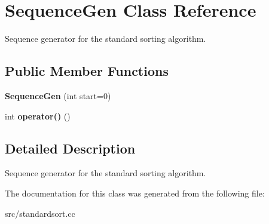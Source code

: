 \hypertarget{classSequenceGen}{
\section{SequenceGen Class Reference}
\label{d4/d99/classSequenceGen}
}


Sequence generator for the standard sorting algorithm.  


\subsection*{Public Member Functions}
\begin{DoxyCompactItemize}
\item 
\hypertarget{classSequenceGen_a4d1ef90f7ec766284371caf9e6c4f791}{
{\bfseries SequenceGen} (int start=0)}
\label{d4/d99/classSequenceGen_a4d1ef90f7ec766284371caf9e6c4f791}

\item 
\hypertarget{classSequenceGen_af63e6e7ae3a2fdcb86a6ed263f953c84}{
int {\bfseries operator()} ()}
\label{d4/d99/classSequenceGen_af63e6e7ae3a2fdcb86a6ed263f953c84}

\end{DoxyCompactItemize}


\subsection{Detailed Description}
Sequence generator for the standard sorting algorithm. 

The documentation for this class was generated from the following file:\begin{DoxyCompactItemize}
\item 
src/standardsort.cc\end{DoxyCompactItemize}
